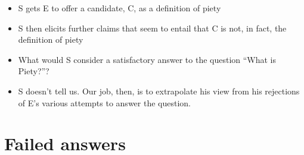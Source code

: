 \documentclass[10 pt]{article}
\begin{document}
\begin{itemize}
\item S gets E to offer a candidate, C, as a definition of piety
\item S then elicits further claims that seem to entail that C is not, in fact, the definition of piety
\item What would S consider a satisfactory answer to the question ``What is Piety?''?
\item S doesn't tell us. Our job, then, is to extrapolate his view from his rejections of E's various attempts to answer the question.
\end{itemize}

\section*{Failed answers}
\end{document}
